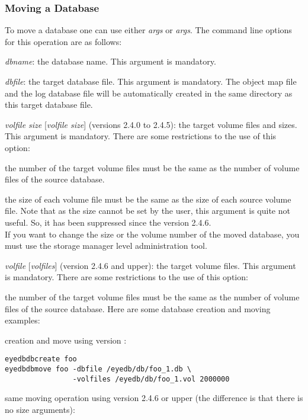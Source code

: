 \subsubsection{Moving a Database}

To move a database one can use either  \emph{args}
or  \emph{args}.
The command line options for this operation are as follows:
\bi
\item \emph{dbname}: the database name. This argument is mandatory.
\item {} \emph{dbfile}:
the target database file. This argument is mandatory.
The object map file
and the log database file will be automatically created in the
same directory as this target database file.
\item {} \emph{volfile size} [\emph{volfile size}] (versions
2.4.0 to 2.4.5):
the target volume files and sizes. This argument is mandatory.
There are some restrictions to the use of this option:
\be
\item the number of the target volume files must be the same as the
number of volume files of the source database.
\item the size of each volume file must be the same as the size
of each source volume file.
\ee
Note that as the size cannot be set by the user, this argument is quite
not useful.
So, it has been suppressed since the version 2.4.6.
\\
If you want to change the size or the volume number of the moved database,
you must use the  storage manager level administration tool.
\item {} \emph{volfile} [\emph{volfiles}] (version
2.4.6 and upper):
the target volume files. This argument is mandatory.
There are some restrictions to the use of this option:
\be
\item the number of the target volume files must be the same as the
number of volume files of the source database.
\ee
\ei
Here are some database creation and moving examples:
\bi
\item creation and move using version \eyedbversion:
\verbsize
\begin{verbatim}
eyedbdbcreate foo
eyedbdbmove foo -dbfile /eyedb/db/foo_1.db \
                -volfiles /eyedb/db/foo_1.vol 2000000
\end{verbatim}
\normalsize
\item same moving operation using version 2.4.6 or upper (the difference is that there is no
size arguments):
\verbsize
